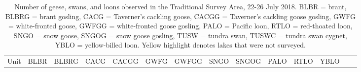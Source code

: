 \documentclass[]{article}
\begin{document}
\begin{longtable}[]{@{}rrrrrrrrrrrrrr@{}}
\caption{Number of geese, swans, and loons observed in the Traditional
Survey Area, 22-26 July 2018. BLBR = brant, BLBRG = brant gosling, CACG
= Taverner's cackling goose, CACGG = Taverner's cackling goose gosling,
GWFG = white-fronted goose, GWFGG = white-fronted goose gosling, PALO =
Pacific loon, RTLO = red-thoated loon, SNGO = snow goose, SNGOG = snow
goose gosling, TUSW = tundra swan, TUSWC = tundra swan cygnet, YBLO =
yellow-billed loon. Yellow highlight denotes lakes that were not
surveyed.}\tabularnewline
\toprule
\begin{minipage}[b]{0.05\columnwidth}\raggedleft\strut
Unit\strut
\end{minipage} & \begin{minipage}[b]{0.04\columnwidth}\raggedleft\strut
BLBR\strut
\end{minipage} & \begin{minipage}[b]{0.05\columnwidth}\raggedleft\strut
BLBRG\strut
\end{minipage} & \begin{minipage}[b]{0.04\columnwidth}\raggedleft\strut
CACG\strut
\end{minipage} & \begin{minipage}[b]{0.05\columnwidth}\raggedleft\strut
CACGG\strut
\end{minipage} & \begin{minipage}[b]{0.05\columnwidth}\raggedleft\strut
GWFG\strut
\end{minipage} & \begin{minipage}[b]{0.05\columnwidth}\raggedleft\strut
GWFGG\strut
\end{minipage} & \begin{minipage}[b]{0.04\columnwidth}\raggedleft\strut
SNGO\strut
\end{minipage} & \begin{minipage}[b]{0.05\columnwidth}\raggedleft\strut
SNGOG\strut
\end{minipage} & \begin{minipage}[b]{0.04\columnwidth}\raggedleft\strut
PALO\strut
\end{minipage} & \begin{minipage}[b]{0.04\columnwidth}\raggedleft\strut
RTLO\strut
\end{minipage} & \begin{minipage}[b]{0.04\columnwidth}\raggedleft\strut
YBLO\strut
\end{minipage} & \begin{minipage}[b]{0.04\columnwidth}\raggedleft\strut

\end{minipage}
\end{longtable}
\end{document}
